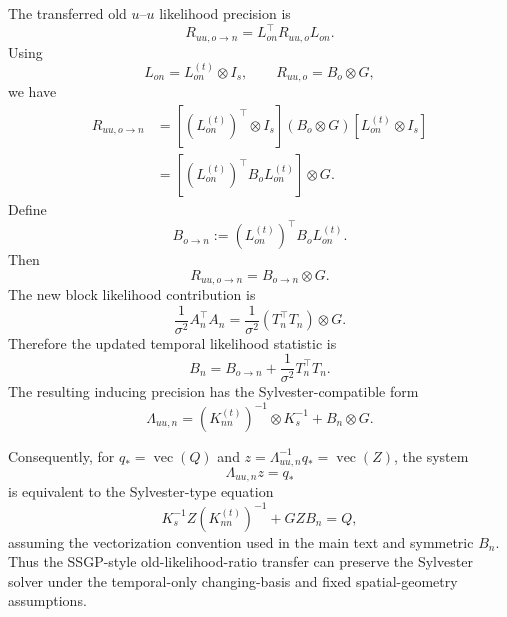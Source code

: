 \documentclass[12pt]{article}
\newcommand{\vecop}{\operatorname{vec}}
\begin{document}
The transferred old $u$--$u$ likelihood precision is
\begin{equation}
    R_{uu,o\rightarrow n}
    =
    L_{on}^\top R_{uu,o}L_{on}.
\end{equation}
Using
\begin{equation}
    L_{on}=L_{on}^{(t)}\otimes I_s,
    \qquad
    R_{uu,o}=B_o\otimes G,
\end{equation}
we have
\begin{align}
    R_{uu,o\rightarrow n}
    &=
    \left[
        \left(L_{on}^{(t)}\right)^\top\otimes I_s
    \right]
    (B_o\otimes G)
    \left[
        L_{on}^{(t)}\otimes I_s
    \right]                                                     \\
    &=
    \left[
        \left(L_{on}^{(t)}\right)^\top
        B_o
        L_{on}^{(t)}
    \right]
    \otimes G.
\end{align}
Define
\begin{equation}
    B_{o\rightarrow n}
    :=
    \left(L_{on}^{(t)}\right)^\top
    B_o
    L_{on}^{(t)}.
\end{equation}
Then
\begin{equation}
    R_{uu,o\rightarrow n}
    =
    B_{o\rightarrow n}\otimes G.
    \label{eq:app_Ruu_transfer_kron}
\end{equation}
The new block likelihood contribution is
\begin{equation}
    \frac{1}{\sigma^2}A_n^\top A_n
    =
    \frac{1}{\sigma^2}
    (T_n^\top T_n)\otimes G.
\end{equation}
Therefore the updated temporal likelihood statistic is
\begin{equation}
    B_n
    =
    B_{o\rightarrow n}
    +
    \frac{1}{\sigma^2}T_n^\top T_n.
    \label{eq:app_Bn_after_transfer}
\end{equation}
The resulting inducing precision has the Sylvester-compatible form
\begin{equation}
    \Lambda_{uu,n}
    =
    \left(K_{nn}^{(t)}\right)^{-1}\otimes K_s^{-1}
    +
    B_n\otimes G.
    \label{eq:app_Lambda_un_sylvester_form}
\end{equation}

Consequently, for \(q_*=\vecop(Q)\) and
\(z=\Lambda_{uu,n}^{-1}q_*=\vecop(Z)\), the system
\begin{equation}
    \Lambda_{uu,n}z=q_*
\end{equation}
is equivalent to the Sylvester-type equation
\begin{equation}
    K_s^{-1}Z
    \left(K_{nn}^{(t)}\right)^{-1}
    +
    GZB_n
    =
    Q,
    \label{eq:app_sylvester_after_transfer}
\end{equation}
assuming the vectorization convention used in the main text and symmetric
\(B_n\). Thus the SSGP-style old-likelihood-ratio transfer can preserve
the Sylvester solver under the temporal-only changing-basis and fixed
spatial-geometry assumptions.
\end{document}
